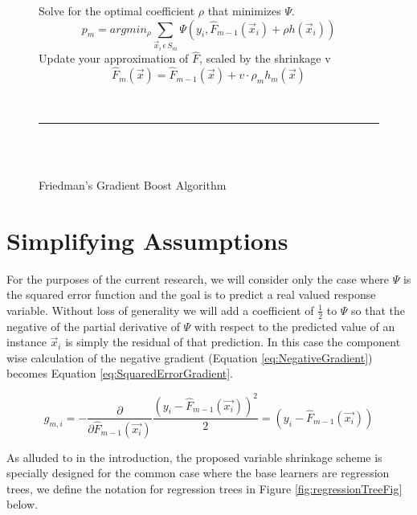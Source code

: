 \documentclass[9pt, conference]{IEEEtran}
\begin{document}
\begin{figure}[t]
\begin{algorithm}[H]
{\begin{equation}
			\end{equation}		
			Solve for the optimal coefficient \(\rho\) that minimizes \(\Psi\).
			\begin{equation}
			p_m = argmin_\rho \sum_{\vec{x}_i \, \epsilon \, S_m}\Psi(y_i, \hat{F}_{m-1}(\vec{x}_i) + \rho h(\vec{x}_i))
			\label{eq:ScalingCoefficent}
			\end{equation}
			Update your approximation of \(\hat{F}\), scaled by the shrinkage v
			\begin{equation}
			\hat{F}_m(\vec{x}) = \hat{F}_{m-1}(\vec{x}) + v  \cdot  \rho_m h_m(\vec{x})
			\label{eq:UpdateStep}
			\end{equation}
		}
		\caption{Friedman's Gradient Boost Algorithm  \cite{2001Friedman} \cite{GBMTut} \cite{2002Friedman} \cite{death2007ABT}}
		\hspace{1 mm} \\\hrule\hspace{1 mm} \\\hspace{1 mm} \\
		\label{alg:GeneralGradientBoost}
	\end{algorithm}

\end{figure}
\section{Simplifying Assumptions}
\label{sec:SimplifyingAssumptions}
For the purposes of the current research, we will consider only the case where \(\Psi\) is the squared error function and the goal is to predict a real valued response variable. Without loss of generality we will add a coefficient of \(\frac{1}{2}\) to \(\Psi\) so that the negative of the partial derivative of \(\Psi\) with respect to the predicted value of an instance \(\vec{x}_i\) is simply the residual of that prediction. In this case the component wise calculation of the negative gradient (Equation \ref{eq:NegativeGradient}) becomes Equation \ref{eq:SquaredErrorGradient}.

\begin{equation}
g_{m,i} = -\frac{\partial}{\partial \hat{F}_{m-1}(\vec{x_i})} \frac{(y_i - \hat{F}_{m-1}(\vec{x_i}))^2}{2} = (y_i - \hat{F}_{m-1}(\vec{x_i}))
\label{eq:SquaredErrorGradient}
\end{equation}

As alluded to in the introduction, the proposed variable shrinkage scheme is specially designed for the common case where the base learners are regression trees, we define the notation for regression trees in Figure \ref{fig:regressionTreeFig} below.
\end{document}
